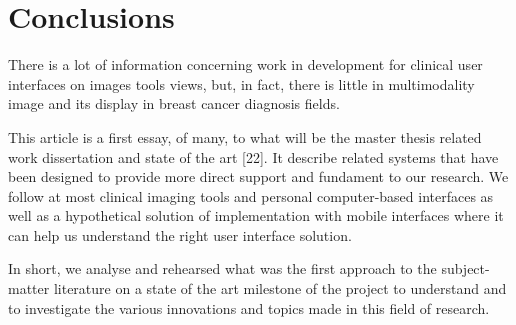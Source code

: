 \section{Conclusions}

There is a lot of information concerning work in development for clinical user interfaces on images tools views, but, in fact, there is little in multimodality image and its display in breast cancer diagnosis fields.

This article is a first essay, of many, to what will be the master thesis related work dissertation and state of the art [22]. It describe related systems that have been designed to provide more direct support and fundament to our research. We follow at most clinical imaging tools and personal computer-based interfaces as well as a hypothetical solution of implementation with mobile interfaces where it can help us understand the right user interface solution.

In short, we analyse and rehearsed what was the first approach to the subject-matter literature on a state of the art milestone of the project to understand and to investigate the various innovations and topics made in this field of research.

\clearpage

